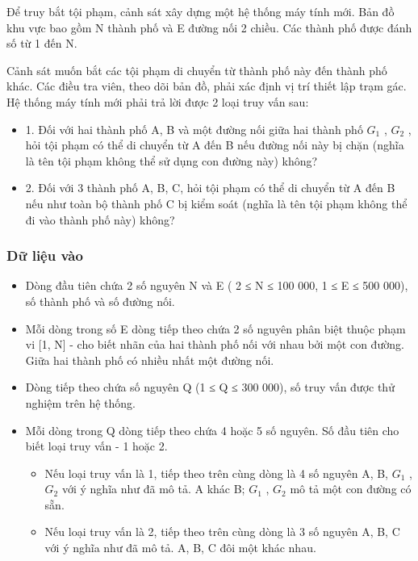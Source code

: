 



   Để truy bắt tội phạm, cảnh sát xây dựng một hệ thống máy tính mới. Bản đồ khu vực bao gồm N thành phố và E đường nối 2 chiều. Các thành phố được đánh số từ 1 đến N.  

   Cảnh sát muốn bắt các tội phạm di chuyển từ thành phố này đến thành phố khác. Các điều tra viên, theo dõi bản đồ, phải xác định vị trí thiết lập trạm gác. Hệ thống máy tính mới phải trả lời được 2 loại   truy vấn sau:  
\begin{itemize}
	\item     1. Đối với hai thành phố A, B và một đường nối giữa hai thành phố $G_{1}$    , $G_{2}$    , hỏi tội phạm có thể di chuyển từ A đến B nếu đường nối này bị chặn (nghĩa là tên tội phạm không   thể sử dụng con đường này) không?   
	\item     2. Đối với 3 thành phố A, B, C, hỏi tội phạm có thể di chuyển từ A đến B nếu như toàn bộ thành phố C bị kiểm soát (nghĩa là tên tội phạm không thể đi vào thành phố này) không?   
\end{itemize}

\subsubsection{   Dữ liệu vào  }
\begin{itemize}
	\item     Dòng đầu tiên chứa 2 số nguyên N và E ( 2 ≤ N ≤ 100 000, 1 ≤ E ≤ 500 000), số thành phố và số đường nối.   
	\item     Mỗi dòng trong số E dòng tiếp theo chứa 2 số nguyên phân biệt thuộc phạm vi [1, N] - cho biết nhãn của hai thành phố nối với nhau bởi một con đường. Giữa hai thành phố có nhiều nhất một đường nối.   
	\item     Dòng tiếp theo chứa số nguyên Q (1 ≤ Q ≤ 300 000), số truy vấn được thử nghiệm trên hệ thống.   
	\item     Mỗi dòng trong Q dòng tiếp theo chứa 4 hoặc 5 số nguyên. Số đầu tiên cho biết loại truy vấn - 1 hoặc 2.    
\begin{itemize}
	\item       Nếu loại truy vấn là 1, tiếp theo trên cùng dòng là 4 số nguyên A, B, $G_{1}$      , $G_{2}$      với ý nghĩa như đã mô tả. A khác B; $G_{1}$      , $G_{2}$      mô tả một con đường có   sẵn.     
	\item       Nếu loại truy vấn là 2, tiếp theo trên cùng dòng là 3 số nguyên A, B, C với ý nghĩa như đã mô tả. A, B, C đôi một khác nhau.     
\end{itemize}
\end{itemize}

